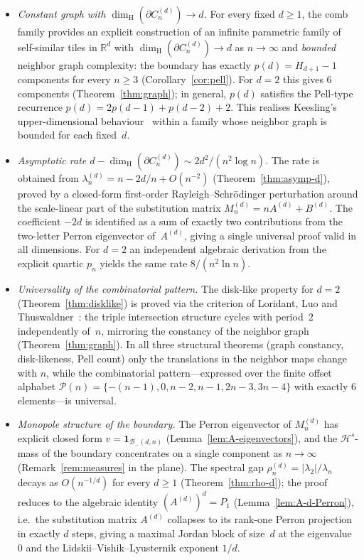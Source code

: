 \documentclass{amsart}
\theoremstyle{definition}
\theoremstyle{remark}
\newcommand{\R}{\mathbb{R}}
\newcommand{\dH}{\dim_{\mathrm{H}}}
\begin{document}
\begin{itemize}

\item \emph{Constant graph with $\dH(\partial C_n^{(d)}) \to d$.}
For every fixed $d \ge 1$, the comb family provides an explicit
construction of an infinite parametric family of self-similar
tiles in $\R^d$ with $\dH(\partial C_n^{(d)}) \to d$ as
$n \to \infty$ and \emph{bounded} neighbor graph complexity: the
boundary has exactly $p(d) = H_{d+1} - 1$ components for every
$n \ge 3$ (Corollary~\ref{cor:pell}).  For $d = 2$
this gives $6$ components (Theorem~\ref{thm:graph}); in general,
$p(d)$ satisfies the Pell-type recurrence
$p(d) = 2 p(d{-}1) + p(d{-}2) + 2$.  This
realises Keesling's upper-dimensional behaviour~\cite{keesling}
within a family whose neighbor graph is bounded for each fixed~$d$.

\item \emph{Asymptotic rate
$d - \dH(\partial C_n^{(d)}) \sim 2 d^2 / (n^2 \log n)$.}
The rate is obtained from $\lambda_n^{(d)} = n - 2d/n + O(n^{-2})$
(Theorem~\ref{thm:asymp-d}), proved by a closed-form
first-order Rayleigh--Schr\"odinger perturbation around the
scale-linear part of the substitution matrix
$M_n^{(d)} = n A^{(d)} + B^{(d)}$.  The coefficient $-2d$ is
identified as a sum of exactly two contributions from the
two-letter Perron eigenvector of~$A^{(d)}$, giving a single
universal proof valid in all dimensions.  For $d = 2$ an
independent algebraic derivation from the explicit quartic
$p_n$ yields the same rate $8/(n^2 \ln n)$.

\item \emph{Universality of the combinatorial pattern.}
The disk-like property for $d = 2$ (Theorem~\ref{thm:disklike})
is proved via the criterion of Loridant, Luo and
Thuswaldner~\cite{loridant-luo-thuswaldner}: the triple
intersection structure cycles with period~$2$ independently
of~$n$, mirroring the constancy of the neighbor graph
(Theorem~\ref{thm:graph}).  In all three structural theorems
(graph constancy, disk-likeness, Pell count) only the
translations in the neighbor maps change with $n$, while the
combinatorial pattern---expressed over the finite offset
alphabet $\mathcal{P}(n) = \{-(n{-}1), 0, n{-}2, n{-}1, 2n{-}3,
3n{-}4\}$ with exactly $6$ elements---is universal.

\item \emph{Monopole structure of the boundary.}
The Perron eigenvector of $M_n^{(d)}$ has explicit closed form
$v = \mathbf{1}_{\mathcal{B}_-(d,n)}$
(Lemma~\ref{lem:A-eigenvectors}), and the $\mathcal{H}^s$-mass
of the boundary concentrates on a single component as
$n \to \infty$ (Remark~\ref{rem:measures} in the plane).  The
spectral gap $\rho_n^{(d)} = |\lambda_2|/\lambda_n$ decays as
$O(n^{-1/d})$ for every $d \ge 1$
(Theorem~\ref{thm:rho-d}); the proof reduces to
the algebraic identity $(A^{(d)})^d = P_1$
(Lemma~\ref{lem:A-d-Perron}), i.e.\ the substitution matrix
$A^{(d)}$ collapses to its rank-one Perron projection in exactly
$d$ steps, giving a maximal Jordan block of size~$d$ at the
eigenvalue~$0$ and the Lidskii--Vishik--Lyusternik exponent
$1/d$.

\end{itemize}
\end{document}
